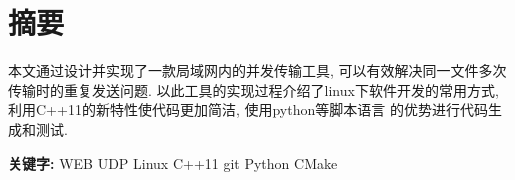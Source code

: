 \chapter*{摘要}

本文通过设计并实现了一款局域网内的并发传输工具,
可以有效解决同一文件多次传输时的重复发送问题.
以此工具的实现过程介绍了linux下软件开发的常用方式,
利用C++11的新特性使代码更加简洁, 使用python等脚本语言
的优势进行代码生成和测试. 

\noindent\textbf{关键字:} WEB UDP Linux C++11 git Python CMake
